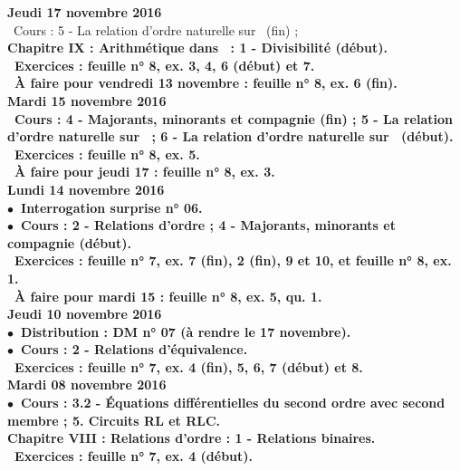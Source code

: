\documentclass[12pt,a4paper]{article}
\begin{document}
\noindent\textbf{Jeudi 17 novembre 2016 }\\
\bu\ Cours : 5 - La relation d'ordre naturelle sur \R\ (fin) ;\\
\bf Chapitre IX \rm : Arithmétique dans \Z\ : 1 - Divisibilité (début).\\
\bu\ Exercices : feuille n° 8, ex. 3, 4, 6 (début) et 7.\\
\bu\ À faire pour vendredi 13 novembre : feuille n° 8, ex. 6 (fin).\vspace{.4cm}\\

\noindent\textbf{\bf Mardi 15 novembre 2016 }\\
\bu\ Cours : 4 - Majorants, minorants et compagnie (fin) ; 5 - La relation d'ordre naturelle sur \N\ ; 6 - La relation 
d'ordre naturelle sur \R\ (début).\\
\bu\ Exercices : feuille n° 8, ex. 5.\\
\bu\ À faire pour jeudi 17 : feuille n° 8, ex. 3.\vspace{.4cm}\\

\noindent\textbf{ Lundi 14 novembre 2016 }\\
$\bullet$\ Interrogation surprise n° 06.\\
$\bullet$\ Cours : 2 - Relations d'ordre ;  4 - Majorants, minorants et compagnie (début).\\
\bu\ Exercices : feuille n° 7, ex. 7 (fin), 2 (fin), 9 et 10, et feuille n° 8, ex. 1.\\
\bu\ À faire pour mardi 15 : feuille n° 8, ex. 5, qu. 1.\vspace{.4cm}\\

\noindent\textbf{Jeudi 10 novembre 2016 }\\
$\bullet$\ Distribution : DM n° 07 (à rendre le 17 novembre).\\
$\bullet$\ Cours : 2 - Relations d'équivalence.\\
\bu\ Exercices : feuille n° 7, ex. 4 (fin), 5, 6, 7 (début) et 8.\vspace{.4cm}\\

\noindent\textbf{\bf Mardi 08 novembre 2016 }\\
$\bullet$\ Cours : 3.2 - Équations différentielles du second ordre avec second membre ; 5. Circuits RL et RLC.\\
\bf Chapitre VIII \rm : Relations d'ordre : 1 - Relations binaires.\\
\bu\ Exercices : feuille n° 7, ex. 4 (début).\vspace{.4cm}\\
\end{document}
